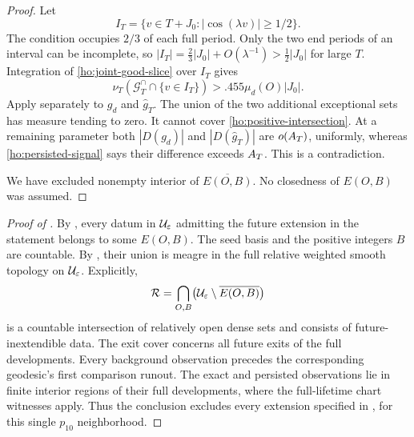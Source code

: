\begin{proof}
Let
\[
 I_T=\{v\in T+J_0:|\cos(\lambda v)|\ge1/2\}.
\]
The condition occupies $2/3$ of each full period.  Only the two end
periods of an interval can be incomplete, so
$|I_T|=\frac23|J_0|+O(\lambda^{-1})>\frac12|J_0|$ for large $T$.
Integration of \eqref{ho:joint-good-slice} over $I_T$ gives
\begin{equation}\label{ho:positive-intersection}
 \nu_T(\mathcal G_T^{\cap}\cap\{v\in I_T\})
                    >.455\mu_d(O)|J_0|.
\end{equation}
Apply  separately to $g_d$ and
$\widehat g_T$.  The union of the two additional exceptional sets has
measure tending to zero.  It cannot cover
\eqref{ho:positive-intersection}.  At a remaining parameter both
$|D(g_d)|$ and $|D(\widehat g_T)|$ are $o(A_T)$, uniformly, whereas
\eqref{ho:persisted-signal} says their difference exceeds $A_T$.
This is a contradiction.

We have excluded nonempty interior of $\overline{E(O,B)}$.
No closedness of $E(O,B)$ was assumed.
\end{proof}

\begin{proof}[Proof of ]
By , every datum in $\mathcal U_{\varepsilon}$ admitting the future
extension in the statement belongs to some $E(O,B)$.
The seed basis and the positive integers $B$ are countable.
By , their union is meagre in the full relative
weighted smooth topology on $\mathcal U_{\varepsilon}$.  Explicitly,
\[
 \mathcal R=\bigcap_{O,B}\bigl(\mathcal U_{\varepsilon}\setminus\overline{E(O,B)}\bigr)
\]
is a countable intersection of relatively open dense sets and consists
of future-inextendible data.
The exit cover concerns all future exits of the full developments.
Every background observation precedes the corresponding geodesic's
first comparison runout. The exact and persisted observations lie in finite interior
regions of their full developments, where the full-lifetime chart
witnesses apply. Thus the conclusion excludes every extension specified
in , for this single $p_{10}$ neighborhood.
\end{proof}
